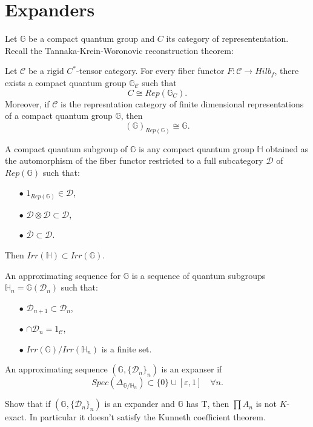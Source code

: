 \section{Expanders}

Let $\mathbb G$ be a compact quantum group and $C$ its category of represententation. Recall the Tannaka-Krein-Woronovic reconstruction theorem:

\begin{thm} Let $\mathcal C$ be a rigid $C^*$-tensor category. For every fiber functor $F : \mathcal C \rightarrow Hilb_f$, there exists a compact quantum group $\mathbb G_\mathcal C$ such that
\[C \cong Rep(\mathbb G_C)  . \]
Moreover, if $\mathcal C$ is the represntation category of finite dimensional representations of a compact quantum group $\mathbb G$, then  
\[(\mathbb G)_{Rep(\mathbb G)}\cong \mathbb G . \]
\end{thm}

\begin{definition}
A compact quantum subgroup of $\mathbb G$ is any compact quantum group $\mathbb H$ obtained as the automorphism of the fiber functor restricted to a full subcategory $\mathcal D$ of $Rep(\mathbb G)$ such that:
\begin{itemize}
\item[$\bullet$] $1_{Rep(\mathbb G)} \in \mathcal D $,
\item[$\bullet$] $ \mathcal D \otimes \mathcal D \subset \mathcal D $,
\item[$\bullet$] $\overline {\mathcal D} \subset \mathcal D$.
\end{itemize} 
Then $Irr(\mathbb H) \subset Irr(\mathbb G)$.
\end{definition}

An approximating sequence for $\mathbb G$ is a sequence of quantum subgroups $\mathbb H_n = \mathbb G(\mathcal D_n)$ such that:
\begin{itemize}
\item[$\bullet$] $\mathcal D_{n+1} \subset \mathcal D_n $,
\item[$\bullet$] $\cap \mathcal D_n = 1_{\mathcal C} $,
\item[$\bullet$] $Irr(\mathbb G)/ Irr(\mathbb H_n)$ is a finite set.
\end{itemize} 

An approximating sequence $(\mathbb G, \{\mathcal D_n\}_n)$ is an expanser if \[Spec(\Delta_{\mathbb G/ \mathbb H_n}) \subset \{0\}\cup [\varepsilon, 1] \quad \forall n.\]

Show that if $(\mathbb G, \{\mathcal D_n\}_n)$ is an expander and $\mathbb G$ has T, then $\prod A_n$ is not $K$-exact. In particular it doesn't satisfy the Kunneth coefficient theorem.

